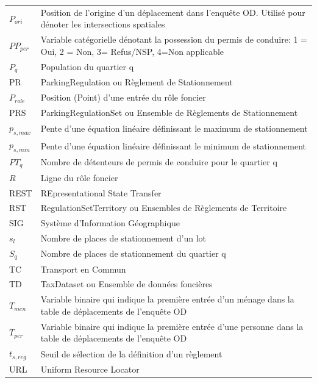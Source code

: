 \begin{longtable}{lp{5in}}
$P_{ori}$ & Position de l'origine d'un déplacement dans l'enquête OD. Utilisé pour dénoter les intersections spatiales \\ 
$PP_{per}$ & Variable catégorielle dénotant la possession du permis de conduire: 1 = Oui, 2 = Non, 3= Refus/NSP, 4=Non applicable\\
$P_q$ & Population du quartier q\\
PR      & ParkingRegulation ou Règlement de Stationnement                                \\
$P_{role}$ & Position (Point) d'une entrée du rôle foncier \\
PRS     & ParkingRegulationSet ou Ensemble de Règlements de Stationnement               \\
$p_{s,max}$ & Pente d'une équation linéaire définissant le maximum de stationnement \\
$p_{s,min}$ & Pente d'une équation linéaire définissant le minimum de stationnement \\
$PT_{q}$ & Nombre de détenteurs de permis de conduire pour le quartier q\\
$R$ & Ligne du rôle foncier \\
REST    & REpresentational State Transfer                                               \\
RST     & RegulationSetTerritory ou Ensembles de Règlements de Territoire               \\
SIG     & Système d'Information Géographique                                            \\
$s_l$ & Nombre de places de stationnement d'un lot\\
$S_q$ & Nombre de places de stationnement du quartier q\\
TC      & Transport en Commun                                                           \\
TD      & TaxDataset ou Ensemble de données foncières                                   \\
$T_{men}$ & Variable binaire qui indique la première entrée d'un ménage dans la table de déplacements de l'enquête OD \\
$T_{per}$ & Variable binaire qui indique la première entrée d'une personne dans la table de déplacements de l'enquête OD\\
$t_{s,reg}$ & Seuil de sélection de la définition d'un règlement \\
URL     & Uniform Resource Locator                                                      \\

\end{longtable}

